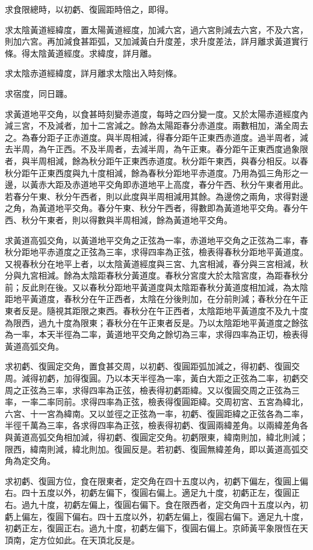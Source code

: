 \begin{pinyinscope}
求食限總時，以初虧、復圓距時倍之，即得。

求太陰黃道經緯度，置太陽黃道經度，加減六宮，過六宮則減去六宮，不及六宮，則加六宮。再加減食甚距弧，又加減黃白升度差，求升度差法，詳月離求黃道實行條。得太陰黃道經度。求緯度，詳月離。

求太陰赤道經緯度，詳月離求太陰出入時刻條。

求宿度，同日躔。

求黃道地平交角，以食甚時刻變赤道度，每時之四分變一度。又於太陽赤道經度內減三宮，不及減者，加十二宮減之。餘為太陽距春分赤道度。兩數相加，滿全周去之。為春分距子正赤道度。與半周相減，得春分距午正東西赤道度。過半周者，減去半周，為午正西。不及半周者，去減半周，為午正東。春分距午正東西度過象限者，與半周相減，餘為秋分距午正東西赤道度。秋分距午東西，與春分相反。以春秋分距午正東西度與九十度相減，餘為春秋分距地平赤道度。乃用為弧三角形之一邊，以黃赤大距及赤道地平交角即赤道地平上高度，春分午西、秋分午東者用此。若春分午東、秋分午西者，則以此度與半周相減用其餘。為邊傍之兩角，求得對邊之角，為黃道地平交角。春分午東、秋分午西者，得數即為黃道地平交角。春分午西、秋分午東者，則以得數與半周相減，餘為黃道地平交角。

求黃道高弧交角，以黃道地平交角之正弦為一率，赤道地平交角之正弦為二率，春秋分距地平赤道度之正弦為三率，求得四率為正弦，檢表得春秋分距地平黃道度。又視春秋分在地平上者，以太陰黃道經度與三宮、九宮相減，春分與三宮相減，秋分與九宮相減。餘為太陰距春秋分黃道度。春秋分宮度大於太陰宮度，為距春秋分前；反此則在後。又以春秋分距地平黃道度與太陰距春秋分黃道度相加減，為太陰距地平黃道度，春秋分在午正西者，太陰在分後則加，在分前則減；春秋分在午正東者反是。隨視其距限之東西。春秋分在午正西者，太陰距地平黃道度不及九十度為限西，過九十度為限東；春秋分在午正東者反是。乃以太陰距地平黃道度之餘弦為一率，本天半徑為二率，黃道地平交角之餘切為三率，求得四率為正切，檢表得黃道高弧交角。

求初虧、復圓定交角，置食甚交周，以初虧、復圓距弧加減之，得初虧、復圓交周。減得初虧，加得復圓。乃以本天半徑為一率，黃白大距之正弦為二率，初虧交周之正弦為三率，求得四率為正弦，檢表得初虧距緯。又以復圓交周之正弦為三率，一率二率同前。求得四率為正弦，檢表得復圓距緯。交周初宮、五宮為緯北，六宮、十一宮為緯南。又以並徑之正弦為一率，初虧、復圓距緯之正弦各為二率，半徑千萬為三率，各求得四率為正弦，檢表得初虧、復圓兩緯差角。以兩緯差角各與黃道高弧交角相加減，得初虧、復圓定交角。初虧限東，緯南則加，緯北則減；限西，緯南則減，緯北則加。復圓反是。若初虧、復圓無緯差角，即以黃道高弧交角為定交角。

求初虧、復圓方位，食在限東者，定交角在四十五度以內，初虧下偏左，復圓上偏右。四十五度以外，初虧左偏下，復圓右偏上。適足九十度，初虧正左，復圓正右。過九十度，初虧左偏上，復圓右偏下。食在限西者，定交角四十五度以內，初虧上偏左，復圓下偏右。四十五度以外，初虧左偏上，復圓右偏下。適足九十度，初虧正左，復圓正右。過九十度，初虧左偏下，復圓右偏上。京師黃平象限恆在天頂南，定方位如此。在天頂北反是。


\end{pinyinscope}
